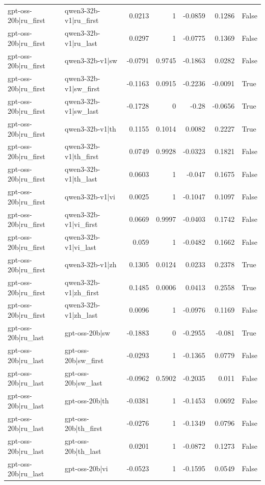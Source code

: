 \begin{table}
\begin{tabular}{l l r r r r l}
gpt-oss-20b|ru_first & qwen3-32b-v1|ru_first & 0.0213 & 1 & -0.0859 & 0.1286 & False \\
gpt-oss-20b|ru_first & qwen3-32b-v1|ru_last & 0.0297 & 1 & -0.0775 & 0.1369 & False \\
gpt-oss-20b|ru_first & qwen3-32b-v1|sw & -0.0791 & 0.9745 & -0.1863 & 0.0282 & False \\
gpt-oss-20b|ru_first & qwen3-32b-v1|sw_first & -0.1163 & 0.0915 & -0.2236 & -0.0091 & True \\
gpt-oss-20b|ru_first & qwen3-32b-v1|sw_last & -0.1728 & 0 & -0.28 & -0.0656 & True \\
gpt-oss-20b|ru_first & qwen3-32b-v1|th & 0.1155 & 0.1014 & 0.0082 & 0.2227 & True \\
gpt-oss-20b|ru_first & qwen3-32b-v1|th_first & 0.0749 & 0.9928 & -0.0323 & 0.1821 & False \\
gpt-oss-20b|ru_first & qwen3-32b-v1|th_last & 0.0603 & 1 & -0.047 & 0.1675 & False \\
gpt-oss-20b|ru_first & qwen3-32b-v1|vi & 0.0025 & 1 & -0.1047 & 0.1097 & False \\
gpt-oss-20b|ru_first & qwen3-32b-v1|vi_first & 0.0669 & 0.9997 & -0.0403 & 0.1742 & False \\
gpt-oss-20b|ru_first & qwen3-32b-v1|vi_last & 0.059 & 1 & -0.0482 & 0.1662 & False \\
gpt-oss-20b|ru_first & qwen3-32b-v1|zh & 0.1305 & 0.0124 & 0.0233 & 0.2378 & True \\
gpt-oss-20b|ru_first & qwen3-32b-v1|zh_first & 0.1485 & 0.0006 & 0.0413 & 0.2558 & True \\
gpt-oss-20b|ru_first & qwen3-32b-v1|zh_last & 0.0096 & 1 & -0.0976 & 0.1169 & False \\
gpt-oss-20b|ru_last & gpt-oss-20b|sw & -0.1883 & 0 & -0.2955 & -0.081 & True \\
gpt-oss-20b|ru_last & gpt-oss-20b|sw_first & -0.0293 & 1 & -0.1365 & 0.0779 & False \\
gpt-oss-20b|ru_last & gpt-oss-20b|sw_last & -0.0962 & 0.5902 & -0.2035 & 0.011 & False \\
gpt-oss-20b|ru_last & gpt-oss-20b|th & -0.0381 & 1 & -0.1453 & 0.0692 & False \\
gpt-oss-20b|ru_last & gpt-oss-20b|th_first & -0.0276 & 1 & -0.1349 & 0.0796 & False \\
gpt-oss-20b|ru_last & gpt-oss-20b|th_last & 0.0201 & 1 & -0.0872 & 0.1273 & False \\
gpt-oss-20b|ru_last & gpt-oss-20b|vi & -0.0523 & 1 & -0.1595 & 0.0549 & False \\

\end{tabular}
\end{table}
